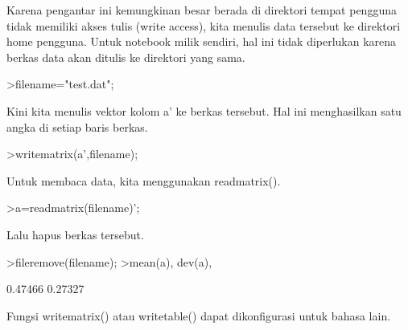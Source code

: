 \documentclass{article}
\newenvironment{eulernotebook}{\par}{\par}
\newenvironment{eulercomment}{\par\medskip}{\par\medskip}
\begin{document}
\begin{eulernotebook}
\begin{eulercomment}
\begin{eulercomment}
\begin{eulercomment}
\begin{eulercomment}
\begin{eulercomment}
\begin{eulercomment}
\begin{eulercomment}
Karena pengantar ini kemungkinan besar berada di direktori tempat
pengguna tidak memiliki akses tulis (write access), kita menulis data
tersebut ke direktori home pengguna. Untuk notebook milik sendiri, hal
ini tidak diperlukan karena berkas data akan ditulis ke direktori yang
sama.
\end{eulercomment}
\begin{eulerprompt}
>filename="test.dat";
\end{eulerprompt}
\begin{eulercomment}
Kini kita menulis vektor kolom a' ke berkas tersebut. Hal ini
menghasilkan satu angka di setiap baris berkas.
\end{eulercomment}
\begin{eulerprompt}
>writematrix(a',filename);
\end{eulerprompt}
\begin{eulercomment}
Untuk membaca data, kita menggunakan readmatrix().
\end{eulercomment}
\begin{eulerprompt}
>a=readmatrix(filename)';
\end{eulerprompt}
\begin{eulercomment}
Lalu hapus berkas tersebut.
\end{eulercomment}
\begin{eulerprompt}
>fileremove(filename);
>mean(a), dev(a),
\end{eulerprompt}
\begin{euleroutput}
  0.47466
  0.27327
\end{euleroutput}
\begin{eulercomment}
Fungsi writematrix() atau writetable() dapat dikonfigurasi untuk
bahasa lain.


\end{eulercomment}
\end{eulercomment}
\end{eulercomment}
\end{eulercomment}
\end{eulercomment}
\end{eulercomment}
\end{eulercomment}
\end{eulernotebook}
\end{document}

